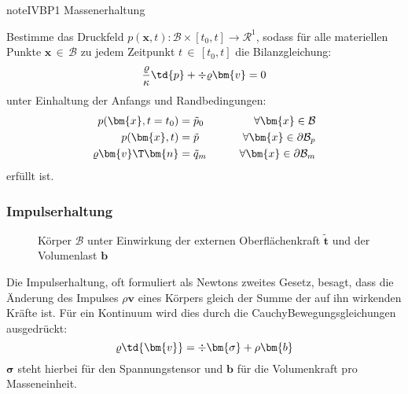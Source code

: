 \documentclass[letterpaper,10pt,german]{jupyterBook}
\let\sphinxpxdimen\pdfpxdimen\else\newdimen\sphinxpxdimen
\begin{document}
\begin{sphinxadmonition}{note}{IVBP1 \sphinxhyphen{} Massenerhaltung}

\sphinxAtStartPar
Bestimme das Druckfeld \(p(\bm{x},t): \mathcal{B} \times [t_0,t] \rightarrow \mathcal{R}^1\), sodass für alle materiellen Punkte \(\bm{x} \, \in \, \mathcal{B}\) zu jedem Zeitpunkt \(t \, \in \, [t_0,t]\) die Bilanzgleichung:
\begin{equation*}
\begin{split}
\frac{\varrho}{\kappa} \td{p} + \div{\varrho {\bm{v}}} = 0 
\end{split}
\end{equation*}
\sphinxAtStartPar
unter Einhaltung der Anfangs\sphinxhyphen{} und Randbedingungen:
\begin{equation*}
\begin{split}
p(\bm{x},t=t_0) & = \tilde{p}_0 \qquad &\forall \bm{x} \in \mathcal{B}& \\
p(\bm{x},t) & = \tilde{p} \qquad &\forall \bm{x} \in \partial \mathcal{B}_p& \\
\varrho \bm{v}\T \bm{n} & = \tilde{q}_m \qquad &\forall \bm{x} \in \partial\mathcal{B}_m&
\end{split}
\end{equation*}
\sphinxAtStartPar
erfüllt ist.
\end{sphinxadmonition}


\subsubsection{Impulserhaltung}
\label{\detokenize{chapters/chapter1/elasticity:impulserhaltung}}
\begin{figure}[htbp]
\centering
\capstart

\noindent\sphinxincludegraphics[height=200\sphinxpxdimen]{{Impulsbilanz}.jpg}
\caption{Körper \(\mathcal{B}\) unter Einwirkung der externen Oberflächenkraft \(\tilde{\bm{t}}\) und der Volumenlast \(\bm{b}\)}\label{\detokenize{chapters/chapter1/elasticity:impulsbilanz-fig-1}}\end{figure}

\sphinxAtStartPar
Die Impulserhaltung, oft formuliert als Newtons zweites Gesetz, besagt, dass die Änderung des Impulses \(\rho \bm{v}\) eines Körpers gleich der Summe der auf ihn wirkenden Kräfte ist. Für ein Kontinuum wird dies durch die Cauchy\sphinxhyphen{}Bewegungsgleichungen ausgedrückt:
\label{equation:chapters/chapter1/elasticity:5615693a-9010-4bfe-a27d-1993426ec866}\begin{equation}
 \varrho \td{\bm{v}} =\div{\bm{\sigma}} + \rho \bm{b}
\end{equation}
\sphinxAtStartPar
\(\boldsymbol{\sigma}\) steht hierbei für den Spannungstensor und \(\mathbf{b}\) für die Volumenkraft pro Masseneinheit.
\end{document}
